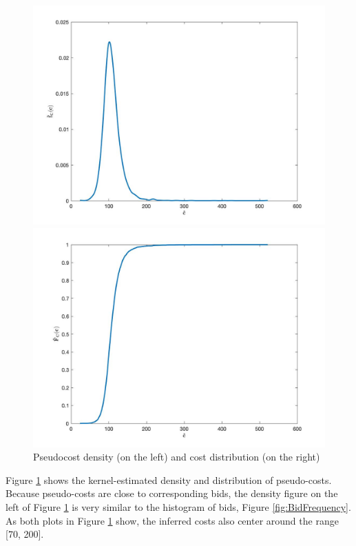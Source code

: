 \documentclass[11pt]{article}
\begin{document}
\begin{figure}[h]
\centering
    \begin{minipage}[h]{0.5\textwidth}
        \centering
        \includegraphics[width=1\linewidth]{costDensity.jpg}
    \end{minipage}%
    \begin{minipage}[h]{0.5\textwidth}
        \centering
        \includegraphics[width=1\linewidth]{costDistribution.jpg}
    \end{minipage}
\caption{Pseudocost density (on the left) and cost distribution (on the right)}
\label{fig:CostEstimation}
\end{figure}

Figure \ref{fig:CostEstimation} shows the kernel-estimated density and 
distribution of pseudo-costs. Because pseudo-costs are close to corresponding 
bids, the density figure on the left of Figure \ref{fig:CostEstimation} is very 
similar to the histogram of bids, Figure \ref{fig:BidFrequency}. As both plots in 
Figure \ref{fig:CostEstimation} show, the inferred costs also center around 
the range [70, 200].
\end{document}
